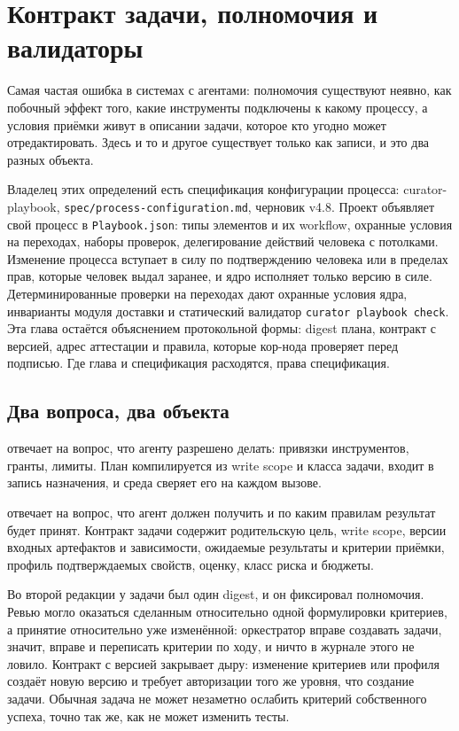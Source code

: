 \chapter{Контракт задачи, полномочия и валидаторы}

Самая частая ошибка в системах с агентами: полномочия существуют неявно, как побочный эффект того, какие инструменты подключены к какому процессу, а условия приёмки живут в описании задачи, которое кто угодно может отредактировать. Здесь и то и другое существует только как записи, и это два разных объекта.

 Владелец этих определений есть спецификация конфигурации процесса: curator-playbook, \texttt{spec/process-configuration.md}, черновик v4.8. Проект объявляет свой процесс в \texttt{Playbook.json}: типы элементов и их workflow, охранные условия на переходах, наборы проверок, делегирование действий человека с потолками. Изменение процесса вступает в силу по подтверждению человека или в пределах прав, которые человек выдал заранее, и ядро исполняет только версию в силе. Детерминированные проверки на переходах дают охранные условия ядра, инварианты модуля доставки и статический валидатор \texttt{curator playbook check}. Эта глава остаётся объяснением протокольной формы: digest плана, контракт с версией, адрес аттестации и правила, которые кор-нода проверяет перед подписью. Где глава и спецификация расходятся, права спецификация.

\section{Два вопроса, два объекта}

 отвечает на вопрос, что агенту разрешено делать: привязки инструментов, гранты, лимиты. План компилируется из write scope и класса задачи, входит в запись назначения, и среда сверяет его на каждом вызове.

 отвечает на вопрос, что агент должен получить и по каким правилам результат будет принят. Контракт задачи содержит родительскую цель, write scope, версии входных артефактов и зависимости, ожидаемые результаты и критерии приёмки, профиль подтверждаемых свойств, оценку, класс риска и бюджеты.

\begin{whybox}
Во второй редакции у задачи был один digest, и он фиксировал полномочия. Ревью могло оказаться сделанным относительно одной формулировки критериев, а принятие относительно уже изменённой: оркестратор вправе создавать задачи, значит, вправе и переписать критерии по ходу, и ничто в журнале этого не ловило. Контракт с версией закрывает дыру: изменение критериев или профиля создаёт новую версию и требует авторизации того же уровня, что создание задачи. Обычная задача не может незаметно ослабить критерий собственного успеха, точно так же, как не может изменить тесты.
\end{whybox}

